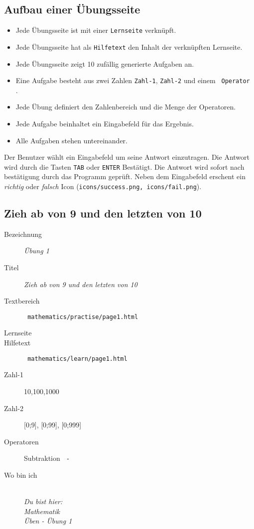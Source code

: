 \subsection{ Aufbau einer Übungsseite }
\label{cha:math-practise-structure}
\begin{itemize}
  \item Jede Übungsseite ist mit einer \texttt{Lernseite} verknüpft.
  \item Jede Übungsseite hat als \texttt{Hilfetext} den Inhalt der verknüpften Lernseite.
  \item Jede Übungsseite zeigt 10 zufällig generierte Aufgaben an.
  \item Eine Aufgabe besteht aus zwei Zahlen \texttt{Zahl-1}, \texttt{Zahl-2} und einem \texttt{ Operator }.
  \item Jede Übung definiert den Zahlenbereich und die Menge der Operatoren.
  \item Jede Aufgabe beinhaltet ein Eingabefeld für das Ergebnis.
  \item Alle Aufgaben stehen untereinander.
\end{itemize}

Der Benutzer wählt ein Eingabefeld um seine Antwort einzutragen. Die Antwort wird durch die Tasten \texttt{TAB} oder \texttt{ENTER} Bestätigt. Die Antwort wird sofort nach bestätigung durch das Programm geprüft. Neben dem Eingabefeld erschent ein \emph{richtig} oder \emph{falsch} Icon (\texttt{icons/success.png, icons/fail.png}).



\subsection{ Zieh ab von 9 und den letzten von 10 }
\label{cha:math-practise-page1}
\begin{description}
  \item[Bezeichnung] \emph{ Übung 1 }
  \item[Titel] \emph{ Zieh ab von 9 und den letzten von 10 }
  \item[Textbereich] \texttt{ mathematics/practise/page1.html }
  \item[Lernseite] 
  \item[Hilfetext] \texttt{ mathematics/learn/page1.html }
  \item[Zahl-1] {10,100,1000}
  \item[Zahl-2] {[0;9], [0;99], [0;999]}
  \item[Operatoren] Subtraktion \texttt{ - }
  \item[Wo bin ich] \emph{\\Du bist hier:\\Mathematik\\Üben - Übung 1}
\end{description}



